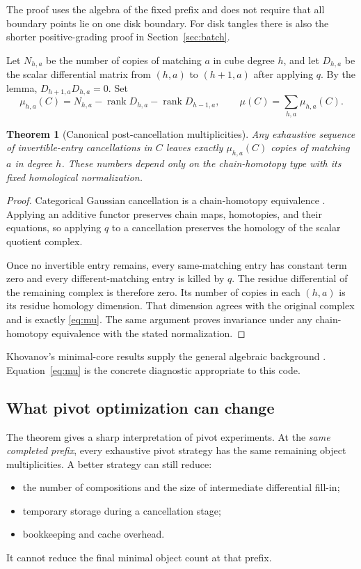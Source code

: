 \documentclass[11pt,letterpaper]{article}
\newtheorem{theorem}{Theorem}[section]
\theoremstyle{definition}
\newcommand{\rank}{\operatorname{rank}}
\begin{document}
The proof uses the algebra of the fixed prefix and does not require that
all boundary points lie on one disk boundary.
For disk tangles there is also the shorter positive-grading proof in
Section~\ref{sec:batch}.

Let \(N_{h,a}\) be the number of copies of matching \(a\) in cube degree
\(h\), and let \(D_{h,a}\) be the scalar differential matrix
from \((h,a)\) to \((h+1,a)\) after applying \(q\).
By the lemma, \(D_{h+1,a}D_{h,a}=0\). Set
\begin{equation}
\label{eq:mu}
 \mu_{h,a}(C)
 =N_{h,a}-\rank D_{h,a}-\rank D_{h-1,a},\qquad
 \mu(C)=\sum_{h,a}\mu_{h,a}(C).
\end{equation}

\begin{theorem}[Canonical post-cancellation multiplicities]
\label{thm:canonical}
Any exhaustive sequence of invertible-entry cancellations in \(C\)
leaves exactly \(\mu_{h,a}(C)\) copies of matching \(a\) in degree \(h\).
These numbers depend only on the chain-homotopy type with its fixed
homological normalization.
\end{theorem}
\begin{proof}
Categorical Gaussian cancellation is a chain-homotopy equivalence
\cite{barnatan}. Applying an additive functor preserves chain maps,
homotopies, and their equations, so applying \(q\) to a cancellation
preserves the homology of the scalar quotient complex.

Once no invertible entry remains, every same-matching entry has constant
term zero and every different-matching entry is killed by \(q\).
The residue differential of the remaining complex is therefore zero.
Its number of copies in each \((h,a)\) is its residue homology dimension.
That dimension agrees with the original complex and is exactly
\eqref{eq:mu}. The same argument proves invariance under any
chain-homotopy equivalence with the stated normalization.
\end{proof}

Khovanov's minimal-core results supply the general algebraic background
\cite[Section 5.1]{khovanovtangles}.
Equation~\eqref{eq:mu} is the concrete diagnostic appropriate to this code.

\subsection{What pivot optimization can change}

The theorem gives a sharp interpretation of pivot experiments.
At the \emph{same completed prefix}, every exhaustive pivot strategy
has the same remaining object multiplicities. A better strategy can
still reduce:
\begin{itemize}
\item the number of compositions and the size of intermediate differential
fill-in;
\item temporary storage during a cancellation stage;
\item bookkeeping and cache overhead.
\end{itemize}
It cannot reduce the final minimal object count at that prefix.
\end{document}
